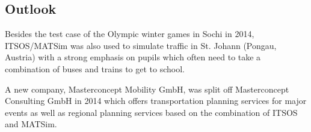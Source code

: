 \subsection{Outlook}
Besides the test case of the Olympic winter games in Sochi in 2014, ITSOS/MATSim
was also used to simulate traffic in St. Johann (Pongau, Austria) with a strong
emphasis on pupils which often need to take a combination of buses and trains to
get to school.

A new company, Masterconcept Mobility GmbH, was split off Masterconcept Consulting GmbH in 2014 which offers transportation planning services for major events as well as regional planning services based on the combination of ITSOS and MATSim.

